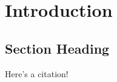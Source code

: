 \chapter{Introduction}

\section{Section Heading}
Here's a citation! \citep{bansal2004correlation}


